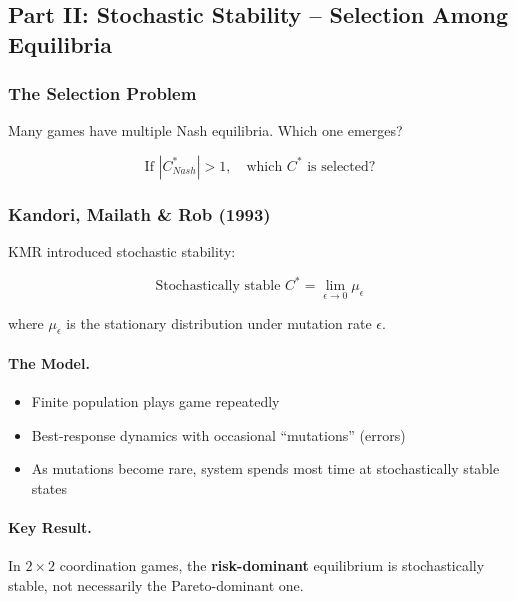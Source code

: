 \subsection{Part II: Stochastic Stability – Selection Among Equilibria}

\subsubsection{The Selection Problem}

Many games have multiple Nash equilibria. Which one emerges?

\begin{equation}
\text{If } |C^*_{Nash}| > 1, \quad \text{which } C^* \text{ is selected?}
\end{equation}

\subsubsection{Kandori, Mailath \& Rob (1993)}

KMR introduced stochastic stability:

\begin{equation}
\boxed{
\text{Stochastically stable } C^* = \lim_{\epsilon \to 0} \mu_\epsilon
}
\label{eq:kmr}
\end{equation}

where $\mu_\epsilon$ is the stationary distribution under mutation rate $\epsilon$.

\paragraph{The Model.}
\begin{itemize}
    \item Finite population plays game repeatedly
    \item Best-response dynamics with occasional ``mutations'' (errors)
    \item As mutations become rare, system spends most time at stochastically stable states
\end{itemize}

\paragraph{Key Result.}
In $2 \times 2$ coordination games, the \textbf{risk-dominant} equilibrium is 
stochastically stable, not necessarily the Pareto-dominant one.

